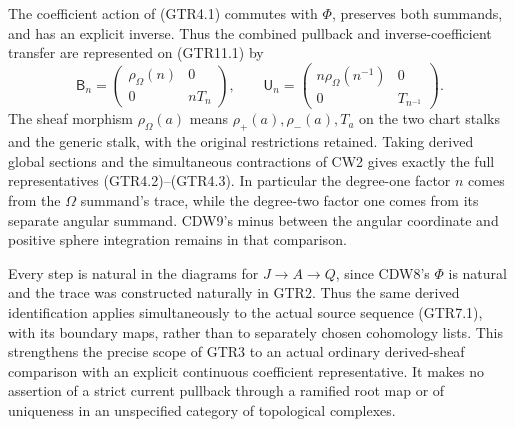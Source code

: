 The coefficient action of (GTR4.1) commutes with \(\Phi\), preserves
both summands, and has an explicit inverse. Thus the combined pullback
and inverse-coefficient transfer are represented on (GTR11.1) by \[
\mathsf B_n=
\begin{pmatrix}\rho_{\Omega}(n)&0\\0&nT_n\end{pmatrix},
\qquad
\mathsf U_n=
\begin{pmatrix}n\rho_{\Omega}(n^{-1})&0\\0&T_{n^{-1}}\end{pmatrix}.
\tag{GTR11.5}
\] The sheaf morphism \(\rho_{\Omega}(a)\) means
\(\rho_+(a),\rho_-(a),T_a\) on the two chart stalks and the generic
stalk, with the original restrictions retained. Taking derived global
sections and the simultaneous contractions of CW2 gives exactly the full
representatives (GTR4.2)--(GTR4.3). In particular the degree-one factor
\(n\) comes from the \(\Omega\) summand's trace, while the degree-two
factor one comes from its separate angular summand. CDW9's minus between
the angular coordinate and positive sphere integration remains in that
comparison.

Every step is natural in the diagrams for \(J\to A\to Q\), since CDW8's
\(\Phi\) is natural and the trace was constructed naturally in GTR2.
Thus the same derived identification applies simultaneously to the
actual source sequence (GTR7.1), with its boundary maps, rather than to
separately chosen cohomology lists. This strengthens the precise scope
of GTR3 to an actual ordinary derived-sheaf comparison with an explicit
continuous coefficient representative. It makes no assertion of a strict
current pullback through a ramified root map or of uniqueness in an
unspecified category of topological complexes.
